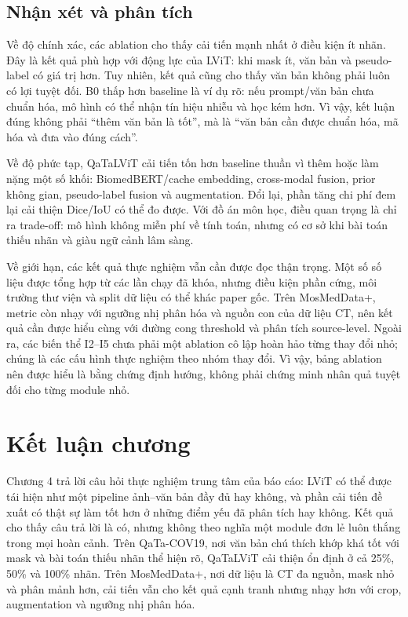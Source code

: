 \subsection{Nhận xét và phân tích}

Về độ chính xác, các ablation cho thấy cải tiến mạnh nhất ở điều kiện ít nhãn. Đây là kết quả phù hợp với động lực của LViT: khi mask ít, văn bản và pseudo-label có giá trị hơn. Tuy nhiên, kết quả cũng cho thấy văn bản không phải luôn có lợi tuyệt đối. B0 thấp hơn baseline là ví dụ rõ: nếu prompt/văn bản chưa chuẩn hóa, mô hình có thể nhận tín hiệu nhiễu và học kém hơn. Vì vậy, kết luận đúng không phải ``thêm văn bản là tốt'', mà là ``văn bản cần được chuẩn hóa, mã hóa và đưa vào đúng cách''.

Về độ phức tạp, QaTaLViT cải tiến tốn hơn baseline thuần vì thêm hoặc làm nặng một số khối: BiomedBERT/cache embedding, cross-modal fusion, prior không gian, pseudo-label fusion và augmentation. Đổi lại, phần tăng chi phí đem lại cải thiện Dice/IoU có thể đo được. Với đồ án môn học, điều quan trọng là chỉ ra trade-off: mô hình không miễn phí về tính toán, nhưng có cơ sở khi bài toán thiếu nhãn và giàu ngữ cảnh lâm sàng.

Về giới hạn, các kết quả thực nghiệm vẫn cần được đọc thận trọng. Một số số liệu được tổng hợp từ các lần chạy đã khóa, nhưng điều kiện phần cứng, môi trường thư viện và split dữ liệu có thể khác paper gốc. Trên MosMedData+, metric còn nhạy với ngưỡng nhị phân hóa và nguồn con của dữ liệu CT, nên kết quả cần được hiểu cùng với đường cong threshold và phân tích source-level. Ngoài ra, các biến thể I2--I5 chưa phải một ablation cô lập hoàn hảo từng thay đổi nhỏ; chúng là các cấu hình thực nghiệm theo nhóm thay đổi. Vì vậy, bảng ablation nên được hiểu là bằng chứng định hướng, không phải chứng minh nhân quả tuyệt đối cho từng module nhỏ.

\section{Kết luận chương}

Chương 4 trả lời câu hỏi thực nghiệm trung tâm của báo cáo: LViT có thể được tái hiện như một pipeline ảnh--văn bản đầy đủ hay không, và phần cải tiến đề xuất có thật sự làm tốt hơn ở những điểm yếu đã phân tích hay không. Kết quả cho thấy câu trả lời là có, nhưng không theo nghĩa một module đơn lẻ luôn thắng trong mọi hoàn cảnh. Trên QaTa-COV19, nơi văn bản chú thích khớp khá tốt với mask và bài toán thiếu nhãn thể hiện rõ, QaTaLViT cải thiện ổn định ở cả 25\%, 50\% và 100\% nhãn. Trên MosMedData+, nơi dữ liệu là CT đa nguồn, mask nhỏ và phân mảnh hơn, cải tiến vẫn cho kết quả cạnh tranh nhưng nhạy hơn với crop, augmentation và ngưỡng nhị phân hóa.

